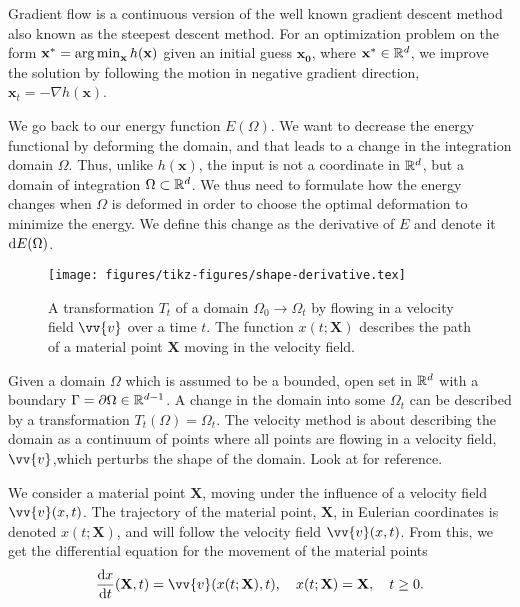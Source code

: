 Gradient flow is a continuous version of the well known gradient descent method also known as the steepest descent method. For an optimization problem on the form $\mathbf{x}^* = \operatorname*{arg\,min}_{\mathbf{x}}h(\mathbf{x})$ given an initial guess $\mathbf{x_0}$, where $\mathbf{x}^* \in \mathbb{R}^d$, we improve the solution by following the motion in negative gradient direction, $\mathbf{x}_t = - \nabla h(\mathbf{x})$.

We go back to our energy function $E(\Omega)$. We want to decrease the energy functional by deforming the domain, and that leads to a change in the integration domain $\Omega$. Thus, unlike $h(\mathbf{x})$, the input is not a coordinate in $\mathbb{R}^d$, but a domain of integration $\Omega\subset \mathbb{R}^d$. We thus need to formulate how the energy changes when $\Omega$ is deformed in order to choose the optimal deformation to minimize the energy. We define this change as the derivative of $E$ and denote it $\mathop{}\!\mathrm{d} E(\Omega)$.

\begin{figure}
    \centering
    \texttt{[image: figures/tikz-figures/shape-derivative.tex]}
    \caption[Shape transformation by velocity field]{A transformation $T_t$ of a domain $\Omega_0\to\Omega_t$ by flowing in a velocity field $\vv{v}$ over a time $t$. The function $x(t; \mathbf{X})$ describes the path of a material point $\mathbf{X}$ moving in the velocity field.}
    \label{fig:shape-transformation}
\end{figure}

Given a domain $\Omega$ which is assumed to be a bounded, open set in $\mathbb{R}^d$ with a boundary $\Gamma = \partial \Omega\in\mathbb{R}^{d-1}$. A change in the domain into some $\Omega_t$ can be described by a transformation $T_t(\Omega) = \Omega_t$. The velocity method is about describing the domain as a continuum of points where all points are flowing in a velocity field, $\vv{v}$,which perturbs the shape of the domain. Look at  for reference.

We consider a material point $\mathbf{X}$, moving under the influence of a velocity field $\vv{v}(x, t)$. The trajectory of the material point, $\mathbf{X}$, in Eulerian coordinates is denoted $x(t; \mathbf{X})$, and will follow the velocity field $\vv{v}(x, t)$. From this, we get the differential equation for the movement of the material points
\begin{equation*}
    \frac{\diff x}{\diff t} (\mathbf{X}, t) = \vv{v}(x(t; \mathbf{X}), t), \quad x(t; \mathbf{X})=\mathbf{X}, \quad t \geq 0.
\end{equation*}

